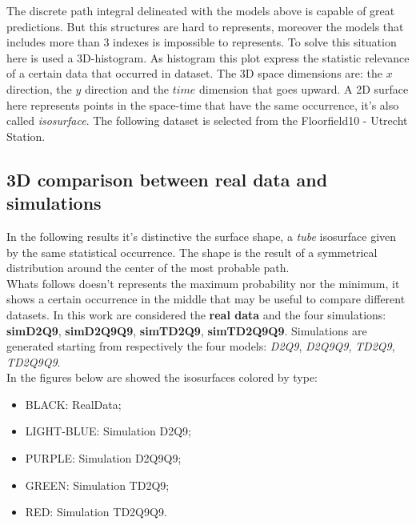 \documentclass[class=article, crop=false]{standalone}
\begin{document}
The discrete path integral delineated with the models above is capable of great predictions.
But this structures are hard to represents, moreover the models that includes more than 3 indexes is impossible to represents.
To solve this situation here is used a 3D-histogram.
As histogram this plot express the statistic relevance of a certain data that occurred in dataset.
The 3D space dimensions are: the $x$ direction, the $y$ direction and the $time$ dimension that goes upward.
A 2D surface here represents points in the space-time that have the same occurrence, it's also called \emph{isosurface}.
The following dataset is selected from the Floorfield10 - Utrecht Station.

\subsection{3D comparison between real data and simulations}
In the following results it's distinctive the surface shape, a \emph{tube} isosurface given by the same statistical occurrence.
The shape is the result of a symmetrical distribution around the center of the most probable path.
\\Whats follows doesn't represents the maximum probability nor the minimum, it shows a certain occurrence in the middle that may be useful to compare different datasets.
In this work are considered the \textbf{real data} and the four simulations: \textbf{simD2Q9}, \textbf{simD2Q9Q9}, \textbf{simTD2Q9}, \textbf{simTD2Q9Q9}.
Simulations are generated starting from respectively the four models: \emph{D2Q9}, \emph{D2Q9Q9}, \emph{TD2Q9}, \emph{TD2Q9Q9}.
\\In the figures below are showed the isosurfaces colored by type:
\begin{itemize}
\item BLACK: RealData;
\item LIGHT-BLUE: Simulation D2Q9;
\item PURPLE: Simulation D2Q9Q9;
\item GREEN: Simulation TD2Q9;
\item RED: Simulation TD2Q9Q9.
\end{itemize}

\FloatBarrier
\newpage
\end{document}

